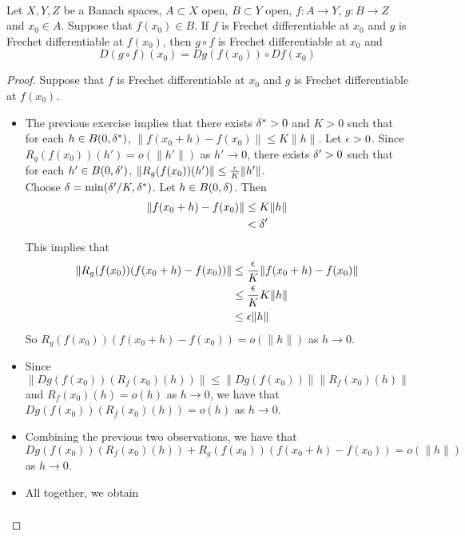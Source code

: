 \documentclass{book}
\begin{document}
	\begin{ex} \\
	Let $X, Y, Z$ be a Banach spaces, $A \subset X$ open, $B \subset Y$ open, $f:A \rightarrow Y$, $g:B \rightarrow Z$ and $x_0 \in A$. Suppose that $f(x_0) \in B$. If $f$ is Frechet differentiable at $x_0$ and $g$ is Frechet differentiable at $f(x_0)$, then $g \circ f$ is Frechet differentiable at $x_0$ and $$D(g \circ f)(x_0) = Dg(f(x_0)) \circ Df(x_0)$$
	\end{ex}
	
	\begin{proof}
	Suppose that $f$ is Frechet differentiable at $x_0$ and $g$ is Frechet differentiable at $f(x_0)$. 
	
	\begin{itemize}
	\item The previous exercise implies that there exists $\delta^* >0$ and $K > 0$ such that for each $h \in B(0, \delta^*)$, $\| f(x_0 + h) - f(x_0) \| \leq K \|h\|$. Let $\epsilon >0$. Since $R_g(f(x_0))(h') = o(\|h'\|)$ as $h' \rightarrow 0$, there exists $\delta' >0$ such that for each $h' \in B(0, \delta')$, $\|R_g(f(x_0))(h')\| \leq \frac{\epsilon}{K} \|h'\|$. \\ Choose $\delta = \min(\delta' / K, \delta^*)$. Let $h \in B(0, \delta)$. Then 
	\begin{align*}
	\| f(x_0 + h) - f(x_0) \| 
	& \leq K \|h\| \\
	&< \delta' 
	\end{align*}
	This implies that 
	\begin{align*}
	\|R_g(f(x_0))(f(x_0 + h) - f(x_0))\| 
	& \leq \frac{\epsilon}{K} \|f(x_0 + h) - f(x_0)\| \\
	& \leq \frac{\epsilon}{K} K\|h\| \\
	& \leq \epsilon \|h\|
	\end{align*}
	So $R_g(f(x_0))(f(x_0 + h) - f(x_0)) = o(\|h\|)$ as $h \rightarrow 0$. \\
	\item Since $\|Dg(f(x_0))(R_f(x_0)(h))\| \leq \|Dg(f(x_0)) \| \|R_f(x_0)(h)\|$ and $R_f(x_0)(h) = o(h)$ as $h \rightarrow 0$, we have that $Dg(f(x_0))(R_f(x_0)(h)) = o(h)$ as $h \rightarrow 0$. \\
	\item Combining the previous two observations, we have that $Dg(f(x_0))(R_f(x_0)(h)) + R_g(f(x_0))(f(x_0 + h) - f(x_0)) = o(\|h\|)$ as $h \rightarrow 0$. \\
	\item All together, we obtain 
	\begin{align*}

\end{align*}
\end{itemize}
\end{proof}
\end{document}
